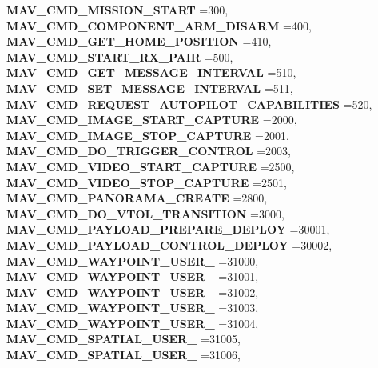 \begin{DoxyCompactItemize}
\textbf{ M\+A\+V\+\_\+\+C\+M\+D\+\_\+\+M\+I\+S\+S\+I\+O\+N\+\_\+\+S\+T\+A\+RT} =300, 
\newline
\textbf{ M\+A\+V\+\_\+\+C\+M\+D\+\_\+\+C\+O\+M\+P\+O\+N\+E\+N\+T\+\_\+\+A\+R\+M\+\_\+\+D\+I\+S\+A\+RM} =400, 
\textbf{ M\+A\+V\+\_\+\+C\+M\+D\+\_\+\+G\+E\+T\+\_\+\+H\+O\+M\+E\+\_\+\+P\+O\+S\+I\+T\+I\+ON} =410, 
\textbf{ M\+A\+V\+\_\+\+C\+M\+D\+\_\+\+S\+T\+A\+R\+T\+\_\+\+R\+X\+\_\+\+P\+A\+IR} =500, 
\textbf{ M\+A\+V\+\_\+\+C\+M\+D\+\_\+\+G\+E\+T\+\_\+\+M\+E\+S\+S\+A\+G\+E\+\_\+\+I\+N\+T\+E\+R\+V\+AL} =510, 
\newline
\textbf{ M\+A\+V\+\_\+\+C\+M\+D\+\_\+\+S\+E\+T\+\_\+\+M\+E\+S\+S\+A\+G\+E\+\_\+\+I\+N\+T\+E\+R\+V\+AL} =511, 
\textbf{ M\+A\+V\+\_\+\+C\+M\+D\+\_\+\+R\+E\+Q\+U\+E\+S\+T\+\_\+\+A\+U\+T\+O\+P\+I\+L\+O\+T\+\_\+\+C\+A\+P\+A\+B\+I\+L\+I\+T\+I\+ES} =520, 
\textbf{ M\+A\+V\+\_\+\+C\+M\+D\+\_\+\+I\+M\+A\+G\+E\+\_\+\+S\+T\+A\+R\+T\+\_\+\+C\+A\+P\+T\+U\+RE} =2000, 
\textbf{ M\+A\+V\+\_\+\+C\+M\+D\+\_\+\+I\+M\+A\+G\+E\+\_\+\+S\+T\+O\+P\+\_\+\+C\+A\+P\+T\+U\+RE} =2001, 
\newline
\textbf{ M\+A\+V\+\_\+\+C\+M\+D\+\_\+\+D\+O\+\_\+\+T\+R\+I\+G\+G\+E\+R\+\_\+\+C\+O\+N\+T\+R\+OL} =2003, 
\textbf{ M\+A\+V\+\_\+\+C\+M\+D\+\_\+\+V\+I\+D\+E\+O\+\_\+\+S\+T\+A\+R\+T\+\_\+\+C\+A\+P\+T\+U\+RE} =2500, 
\textbf{ M\+A\+V\+\_\+\+C\+M\+D\+\_\+\+V\+I\+D\+E\+O\+\_\+\+S\+T\+O\+P\+\_\+\+C\+A\+P\+T\+U\+RE} =2501, 
\textbf{ M\+A\+V\+\_\+\+C\+M\+D\+\_\+\+P\+A\+N\+O\+R\+A\+M\+A\+\_\+\+C\+R\+E\+A\+TE} =2800, 
\newline
\textbf{ M\+A\+V\+\_\+\+C\+M\+D\+\_\+\+D\+O\+\_\+\+V\+T\+O\+L\+\_\+\+T\+R\+A\+N\+S\+I\+T\+I\+ON} =3000, 
\textbf{ M\+A\+V\+\_\+\+C\+M\+D\+\_\+\+P\+A\+Y\+L\+O\+A\+D\+\_\+\+P\+R\+E\+P\+A\+R\+E\+\_\+\+D\+E\+P\+L\+OY} =30001, 
\textbf{ M\+A\+V\+\_\+\+C\+M\+D\+\_\+\+P\+A\+Y\+L\+O\+A\+D\+\_\+\+C\+O\+N\+T\+R\+O\+L\+\_\+\+D\+E\+P\+L\+OY} =30002, 
\textbf{ M\+A\+V\+\_\+\+C\+M\+D\+\_\+\+W\+A\+Y\+P\+O\+I\+N\+T\+\_\+\+U\+S\+E\+R\+\_} =31000, 
\newline
\textbf{ M\+A\+V\+\_\+\+C\+M\+D\+\_\+\+W\+A\+Y\+P\+O\+I\+N\+T\+\_\+\+U\+S\+E\+R\+\_} =31001, 
\textbf{ M\+A\+V\+\_\+\+C\+M\+D\+\_\+\+W\+A\+Y\+P\+O\+I\+N\+T\+\_\+\+U\+S\+E\+R\+\_} =31002, 
\textbf{ M\+A\+V\+\_\+\+C\+M\+D\+\_\+\+W\+A\+Y\+P\+O\+I\+N\+T\+\_\+\+U\+S\+E\+R\+\_} =31003, 
\textbf{ M\+A\+V\+\_\+\+C\+M\+D\+\_\+\+W\+A\+Y\+P\+O\+I\+N\+T\+\_\+\+U\+S\+E\+R\+\_} =31004, 
\newline
\textbf{ M\+A\+V\+\_\+\+C\+M\+D\+\_\+\+S\+P\+A\+T\+I\+A\+L\+\_\+\+U\+S\+E\+R\+\_} =31005, 
\textbf{ M\+A\+V\+\_\+\+C\+M\+D\+\_\+\+S\+P\+A\+T\+I\+A\+L\+\_\+\+U\+S\+E\+R\+\_} =31006, 

\end{DoxyCompactItemize}
